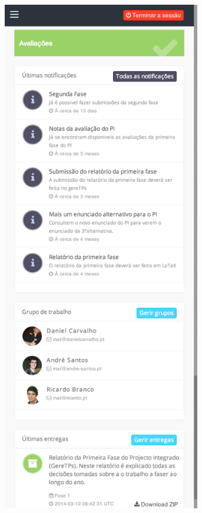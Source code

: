  \begin{figure}[H]
	\centering
	\begin{subfigure}{0.45\textwidth}
 		\centering
 		\includegraphics[width=0.95\textwidth]{images/implementacao/alunos/project_small}

\end{subfigure}
\end{figure}
